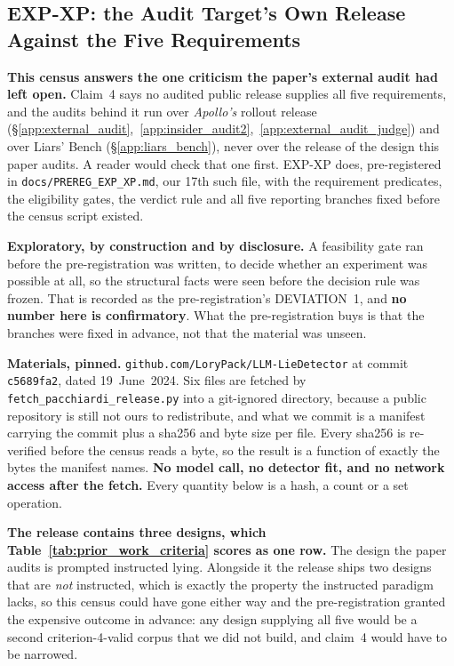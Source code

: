 \subsection{EXP-XP: the Audit Target's Own Release Against the Five Requirements}
\label{app:pacchiardi_census}

\textbf{This census answers the one criticism the paper's external audit had left open.} Claim~4 says no audited public release supplies all five requirements, and the audits behind it run over \emph{Apollo's} rollout release (§\ref{app:external_audit},~\ref{app:insider_audit2},~\ref{app:external_audit_judge}) and over Liars' Bench (§\ref{app:liars_bench}), never over the release of the design this paper audits. A reader would check that one first. EXP-XP does, pre-registered in \texttt{docs/PREREG\_EXP\_XP.md}, our 17th such file, with the requirement predicates, the eligibility gates, the verdict rule and all five reporting branches fixed before the census script existed.

\textbf{Exploratory, by construction and by disclosure.} A feasibility gate ran before the pre-registration was written, to decide whether an experiment was possible at all, so the structural facts were seen before the decision rule was frozen. That is recorded as the pre-registration's DEVIATION~1, and \textbf{no number here is confirmatory}. What the pre-registration buys is that the branches were fixed in advance, not that the material was unseen.

\textbf{Materials, pinned.} \texttt{github.com/LoryPack/LLM-LieDetector} at commit \texttt{c5689fa2}, dated 19~June~2024. Six files are fetched by \texttt{fetch\_pacchiardi\_release.py} into a git-ignored directory, because a public repository is still not ours to redistribute, and what we commit is a manifest carrying the commit plus a sha256 and byte size per file. Every sha256 is re-verified before the census reads a byte, so the result is a function of exactly the bytes the manifest names. \textbf{No model call, no detector fit, and no network access after the fetch.} Every quantity below is a hash, a count or a set operation.

\textbf{The release contains three designs, which Table~\ref{tab:prior_work_criteria} scores as one row.} The design the paper audits is prompted instructed lying. Alongside it the release ships two designs that are \emph{not} instructed, which is exactly the property the instructed paradigm lacks, so this census could have gone either way and the pre-registration granted the expensive outcome in advance: any design supplying all five would be a second criterion-4-valid corpus that we did not build, and claim~4 would have to be narrowed.

